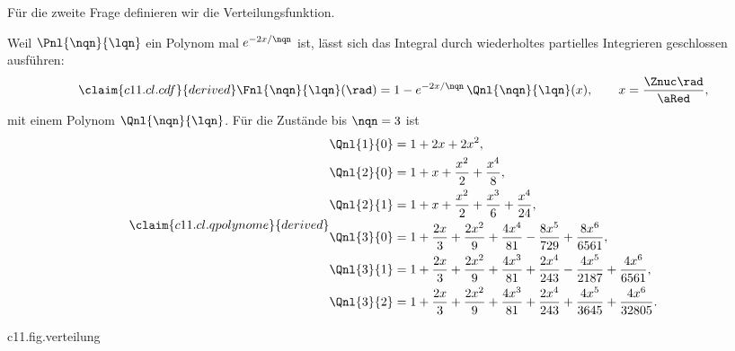 \begin{vertiefung}
  Für die zweite Frage definieren wir die Verteilungsfunktion.


  Weil $\Pnl{\nqn}{\lqn}$ ein Polynom mal $e^{-2x/\nqn}$ ist, lässt sich das Integral
  durch wiederholtes partielles Integrieren geschlossen ausführen:
  \begin{equation}\label{c11.eq.cdf}\claim{c11.cl.cdf}{derived}
    \Fnl{\nqn}{\lqn}(\rad) = 1 - e^{-2x/\nqn}\,\Qnl{\nqn}{\lqn}(x),
    \qquad
    x = \frac{\Znuc\rad}{\aRed},
  \end{equation}
  mit einem Polynom $\Qnl{\nqn}{\lqn}$. Für die Zustände bis $\nqn = 3$ ist
  \begin{equation}\label{c11.eq.qpolynome}\claim{c11.cl.qpolynome}{derived}
    \begin{aligned}
      \Qnl{1}{0} &= 1 + 2x + 2x^2, \\
      \Qnl{2}{0} &= 1 + x + \frac{x^2}{2} + \frac{x^4}{8}, \\
      \Qnl{2}{1} &= 1 + x + \frac{x^2}{2} + \frac{x^3}{6} + \frac{x^4}{24}, \\
      \Qnl{3}{0} &= 1 + \frac{2x}{3} + \frac{2x^2}{9} + \frac{4x^4}{81}
                    - \frac{8x^5}{729} + \frac{8x^6}{6561}, \\
      \Qnl{3}{1} &= 1 + \frac{2x}{3} + \frac{2x^2}{9} + \frac{4x^3}{81}
                    + \frac{2x^4}{243} - \frac{4x^5}{2187} + \frac{4x^6}{6561}, \\
      \Qnl{3}{2} &= 1 + \frac{2x}{3} + \frac{2x^2}{9} + \frac{4x^3}{81}
                    + \frac{2x^4}{243} + \frac{4x^5}{3645} + \frac{4x^6}{32805}.
    \end{aligned}
  \end{equation}

  \begin{tpcfigure}{c11.fig.verteilung}
    \caption{Die Verteilungsfunktionen $\Fnl{1}{0}$, $\Fnl{2}{0}$ und $\Fnl{2}{1}$ nach
      \eqref{c11.eq.cdf} für $\Znuc = 1$: die Wahrscheinlichkeit, den Abstand kleiner
      als $\rad$ zu finden. Am Knoten von 2s, dem markierten Punkt bei
      $\rad = 2\aRed$, hat $\Fnl{2}{0}$ eine waagerechte Tangente.}
  \end{tpcfigure}


\end{vertiefung}
